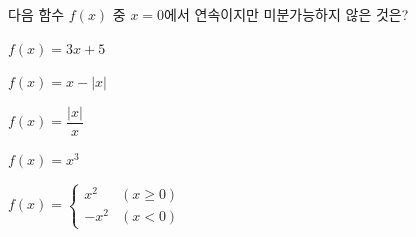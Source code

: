 다음 함수 $f(x)$ 중 $x=0$에서 연속이지만 미분가능하지 않은 것은?
\begin{choicesii}{\rule[-3ex]{0pt}{8ex}$f(x)=3x+5$}{\rule[-3ex]{0pt}{8ex}$f(x)=x-|x|$}{\rule[-3ex]{0pt}{8ex}$f(x)=\dfrac{|x|}{x}$}{\rule[-3ex]{0pt}{8ex}$f(x)=x^3$}{\rule[-3ex]{0pt}{8ex}$f(x)=\begin{cases} x^2 & (x\ge 0) \\ -x^2 & (x<0) \end{cases}$}\end{choicesii}
